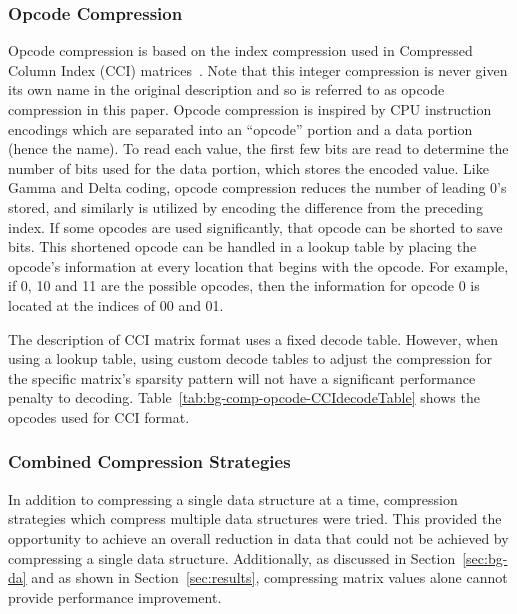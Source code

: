 \subsubsection{Opcode Compression}
\label{sec:bg-comp-opcode}
Opcode compression is based on the index compression used in Compressed Column Index (CCI) matrices~\cite{Lawlor:2013:compression}.
Note that this integer compression is never given its own name in the original description and so is referred to as opcode compression in this paper.
Opcode compression is inspired by CPU instruction encodings which are separated into an ``opcode'' portion and a data portion (hence the name).
To read each value, the first few bits are read to determine the number of bits used for the data portion, which stores the encoded value.
Like Gamma and Delta coding, opcode compression reduces the number of leading 0's stored, and similarly is utilized by encoding the difference from the preceding index.
If some opcodes are used significantly, that opcode can be shorted to save bits.
This shortened opcode can be handled in a lookup table by placing the opcode's information at every location that begins with the opcode.
For example, if 0, 10 and 11 are the possible opcodes, then the information for opcode 0 is located at the indices of 00 and 01.

The description of CCI matrix format uses a fixed decode table.
However, when using a lookup table, using custom decode tables to adjust the compression for the specific matrix's sparsity pattern will not have a significant performance penalty to decoding.
Table~\ref{tab:bg-comp-opcode-CCIdecodeTable} shows the opcodes used for CCI format.



\subsubsection{Combined Compression Strategies}
\label{sec:bg-comp-combined}
In addition to compressing a single data structure at a time, compression strategies which compress multiple data structures were tried.
This provided the opportunity to achieve an overall reduction in data that could not be achieved by compressing a single data structure.
Additionally, as discussed in Section~\ref{sec:bg-da} and as shown in Section~\ref{sec:results}, compressing matrix values alone cannot provide performance improvement.
